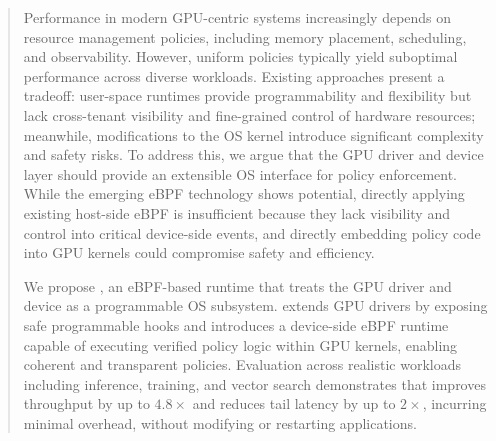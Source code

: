 \begin{abstract}
Performance in modern GPU-centric systems increasingly depends on resource management policies, including memory placement, scheduling, and observability. However, uniform policies typically yield suboptimal performance across diverse workloads. Existing approaches present a tradeoff: user-space runtimes provide programmability and flexibility but lack cross-tenant visibility and fine-grained control of hardware resources; meanwhile, modifications to the OS kernel introduce significant complexity and safety risks. To address this, we argue that the GPU driver and device layer should provide an extensible OS interface for policy enforcement. While the emerging eBPF technology shows potential, directly applying existing host-side eBPF is insufficient because they lack visibility and control into critical device-side events, and directly embedding policy code into GPU kernels could compromise safety and efficiency.

We propose \sys, an eBPF-based runtime that treats the GPU driver and device as a programmable OS subsystem. \sys extends GPU drivers by exposing safe programmable hooks and introduces a device-side eBPF runtime capable of executing verified policy logic within GPU kernels, enabling coherent and transparent policies. Evaluation across realistic workloads including inference, training, and vector search demonstrates that \sys improves throughput by up to $4.8\times$ and reduces tail latency by up to $2\times$, incurring minimal overhead, without modifying or restarting applications.



\end{abstract}

